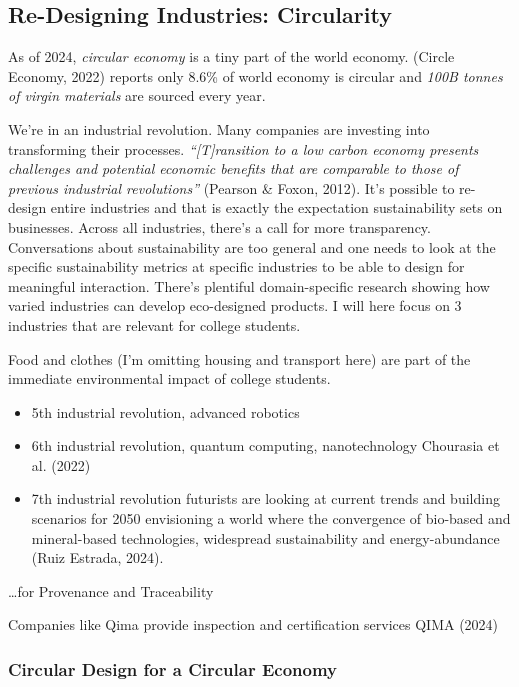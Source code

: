 \documentclass[
  letterpaper,
  DIV=11,
  numbers=noendperiod]{scrartcl}
\providecommand{\tightlist}{%
  \setlength{\itemsep}{0pt}\setlength{\parskip}{0pt}}\usepackage{longtable,booktabs,array}
\begin{document}
\subsection{Re-Designing Industries:
Circularity}\label{re-designing-industries-circularity}

As of 2024, \emph{circular economy} is a tiny part of the world economy.
(Circle Economy, 2022) reports only 8.6\% of world economy is circular
and \emph{100B tonnes of virgin materials} are sourced every year.

We're in an industrial revolution. Many companies are investing into
transforming their processes. \emph{``{[}T{]}ransition to a low carbon
economy presents challenges and potential economic benefits that are
comparable to those of previous industrial revolutions''} (Pearson \&
Foxon, 2012). It's possible to re-design entire industries and that is
exactly the expectation sustainability sets on businesses. Across all
industries, there's a call for more transparency. Conversations about
sustainability are too general and one needs to look at the specific
sustainability metrics at specific industries to be able to design for
meaningful interaction. There's plentiful domain-specific research
showing how varied industries can develop eco-designed products. I will
here focus on 3 industries that are relevant for college students.

Food and clothes (I'm omitting housing and transport here) are part of
the immediate environmental impact of college students.

\begin{itemize}
\tightlist
\item
  5th industrial revolution, advanced robotics
\item
  6th industrial revolution, quantum computing, nanotechnology Chourasia
  et al. (2022)
\item
  7th industrial revolution futurists are looking at current trends and
  building scenarios for 2050 envisioning a world where the convergence
  of bio-based and mineral-based technologies, widespread sustainability
  and energy-abundance (Ruiz Estrada, 2024).
\end{itemize}

\ldots for Provenance and Traceability

Companies like Qima provide inspection and certification services QIMA
(2024)

\subsubsection{Circular Design for a Circular
Economy}\label{circular-design-for-a-circular-economy}
\end{document}
